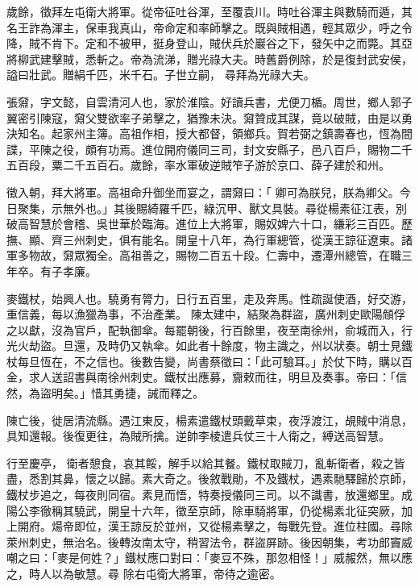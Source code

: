 \begin{pinyinscope}
 歲餘，徵拜左屯衛大將軍。從帝征吐谷渾，至覆袁川。時吐谷渾主與數騎而遁，其名王詐為渾主，保車我真山，帝命定和率師擊之。既與賊相遇，輕其眾少，呼之令降，賊不肯下。定和不被甲，挺身登山，賊伏兵於巖谷之下，發矢中之而斃。其亞將柳武建擊賊，悉斬之。帝為流涕，贈光祿大夫。時舊爵例除，於是復封武安侯，謚曰壯武。贈絹千匹，米千石。子世立嗣，
 尋拜為光祿大夫。



 張奫，字文懿，自雲清河人也，家於淮陰。好讀兵書，尤便刀楯。周世，鄉人郭子翼密引陳寇，奫父雙欲率子弟擊之，猶豫未決。奫贊成其謀，竟以破賊，由是以勇決知名。起家州主簿。高祖作相，授大都督，領鄉兵。賀若弼之鎮壽春也，恆為間諜，平陳之役，頗有功焉。進位開府儀同三司，封文安縣子，邑八百戶，賜物二千五百段，粟二千五百石。歲餘，率水軍破逆賊笮子游於京口、薛子建於和州。



 徵入朝，拜大將軍。高祖命升御坐而宴之，謂奫曰：「
 卿可為朕兒，朕為卿父。今日聚集，示無外也。」其後賜綺羅千匹，綠沉甲、獸文具裝。尋從楊素征江表，別破高智慧於會稽、吳世華於臨海。進位上大將軍，賜奴婢六十口，縑彩三百匹。歷撫、顯、齊三州刺史，俱有能名。開皇十八年，為行軍總管，從漢王諒征遼東。諸軍多物故，奫眾獨全。高祖善之，賜物二百五十段。仁壽中，遷潭州總管，在職三年卒。有子孝廉。



 麥鐵杖，始興人也。驍勇有膂力，日行五百里，走及奔馬。性疏誕使酒，好交游，重信義，每以漁獵為事，不治產業。
 陳太建中，結聚為群盜，廣州刺史歐陽頠俘之以獻，沒為官戶，配執御傘。每罷朝後，行百餘里，夜至南徐州，俞城而入，行光火劫盜。旦還，及時仍又執傘。如此者十餘度，物主識之，州以狀奏。朝士見鐵杖每旦恆在，不之信也。後數告變，尚書蔡徵曰：「此可驗耳。」於仗下時，購以百金，求人送詔書與南徐州刺史。鐵杖出應募，齎敕而往，明旦及奏事。帝曰：「信然，為盜明矣。」惜其勇捷，誡而釋之。



 陳亡後，徙居清流縣。遇江東反，楊素遣鐵杖頭戴草束，夜浮渡江，覘賊中消息，具知還報。後復更往，為賊所擒。逆帥李棱遣兵仗三十人衛之，縛送高智慧。



 行至慶亭，
 衛者憩食，哀其餒，解手以給其餐。鐵杖取賊刀，亂斬衛者，殺之皆盡，悉割其鼻，懷之以歸。素大奇之。後敘戰勛，不及鐵杖，遇素馳驛歸於京師，鐵杖步追之，每夜則同宿。素見而悟，特奏授儀同三司。以不識書，放還鄉里。成陽公李徹稱其驍武，開皇十六年，徵至京師，除車騎將軍，仍從楊素北征突厥，加上開府。煬帝即位，漢王諒反於並州，又從楊素擊之，每戰先登。進位柱國。尋除萊州刺史，無治名。後轉汝南太守，稍習法令，群盜屏跡。後因朝集，考功郎竇威嘲之曰：「麥是何姓？」鐵杖應口對曰：「麥豆不殊，那忽相怪！」威赧然，無以應之，時人以為敏慧。尋
 除右屯衛大將軍，帝待之逾密。




\end{pinyinscope}
